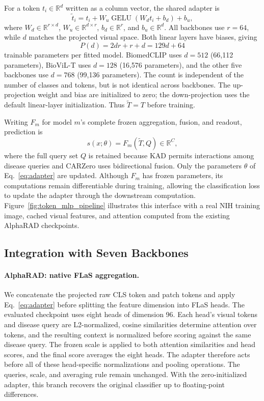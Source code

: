 \documentclass[10pt,twocolumn,letterpaper]{article}
\newcommand{\R}{\mathbb{R}}
\DeclareMathOperator{\GELU}{GELU}
\begin{document}
For a token $t_i\in\R^d$ written as a column vector, the shared adapter is
\begin{equation}
\tilde t_i=t_i+W_u\GELU(W_d t_i+b_d)+b_u,
\label{eq:adapter}
\end{equation}
where $W_d\in\R^{r\times d}$, $W_u\in\R^{d\times r}$, $b_d\in\R^r$, and $b_u\in\R^d$. All backbones use $r=64$, while $d$ matches the projected visual space. Both linear layers have biases, giving
\begin{equation}
P(d)=2dr+r+d=129d+64
\label{eq:params}
\end{equation}
trainable parameters per fitted model. BiomedCLIP uses $d=512$ (66,112 parameters), BioViL-T uses $d=128$ (16,576 parameters), and the other five backbones use $d=768$ (99,136 parameters). The count is independent of the number of classes and tokens, but is not identical across backbones. The up-projection weight and bias are initialized to zero; the down-projection uses the default linear-layer initialization. Thus $\tilde T=T$ before training.

Writing $F_m$ for model $m$'s complete frozen aggregation, fusion, and readout, prediction is
\begin{equation}
s(x;\theta)=F_m(\tilde T,Q)\in\R^C,
\label{eq:generic}
\end{equation}
where the full query set $Q$ is retained because KAD permits interactions among disease queries and CARZero uses bidirectional fusion. Only the parameters $\theta$ of Eq.~\eqref{eq:adapter} are updated. Although $F_m$ has frozen parameters, its computations remain differentiable during training, allowing the classification loss to update the adapter through the downstream computation. Figure~\ref{fig:token_mlp_pipeline} illustrates this interface with a real NIH training image, cached visual features, and attention computed from the existing AlphaRAD checkpoints.




\subsection{Integration with Seven Backbones}
\paragraph{AlphaRAD: native FLaS aggregation.}
We concatenate the projected raw CLS token and patch tokens and apply Eq.~\eqref{eq:adapter} before splitting the feature dimension into FLaS heads. The evaluated checkpoint uses eight heads of dimension 96. Each head's visual tokens and disease query are L2-normalized, cosine similarities determine attention over tokens, and the resulting context is normalized before scoring against the same disease query. The frozen scale is applied to both attention similarities and head scores, and the final score averages the eight heads. The adapter therefore acts before all of these head-specific normalizations and pooling operations. The queries, scale, and averaging rule remain unchanged. With the zero-initialized adapter, this branch recovers the original classifier up to floating-point differences.
\end{document}

